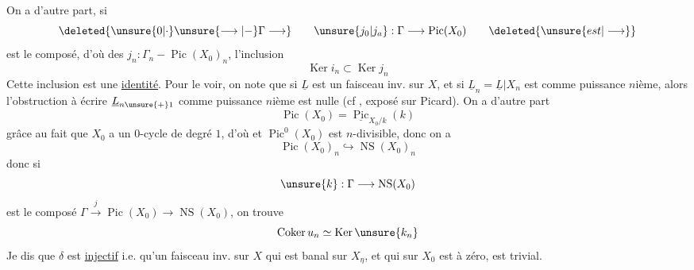 On a d'autre part, si
\[
\deleted{\unsure{0|\cdot}\unsure{\longrightarrow|\mathbin{-}}\Gamma\longrightarrow}\qquad \unsure{j_0|j_a}:\Gamma\longrightarrow\operatorname{Pic}(X_0)\qquad\deleted{\unsure{est|\longrightarrow}}
\]
est le composé, d'où des $j_n:\Gamma_n\mathbin{-}\operatorname{Pic}(X_0)_n$,   l'inclusion \unsure{:|;}
\[
\operatorname{Ker}i_n\subset\operatorname{Ker}j_n
\]
Cette inclusion est  une \uline{identité}. Pour le voir, on note que si $\underline L$ est un faisceau inv. sur $X$, et si $\underline L_n=\underline L|X_n$ est  comme puissance $n$ième, alors l'obstruction à écrire $\underline L_{n\unsure{+}1}$ comme puissance $n$ième est nulle (cf , exposé sur Picard). On a d'autre part
\[
\operatorname{Pic}(X_0)=\underline{\operatorname{Pic}}_{X_0/k}(k)
\]
grâce au fait que $X_0$ a un $0$-cycle de degré $1$, d'où
et $\operatorname{Pic}^{0}(X_0)$ est $n$-divisible, donc on a
\[
\operatorname{Pic}(X_0)_n\hookrightarrow\operatorname{NS}(X_0)_n
\]
donc si
\[
\unsure{k}:\Gamma\longrightarrow\operatorname{NS}(X_0)
\]
est le composé $\Gamma\xrightarrow{j}\operatorname{Pic}(X_0)\longrightarrow\operatorname{NS}(X_0)$, on trouve
\[
\operatorname{Coker}u_n\simeq\operatorname{Ker}\unsure{k_n}
\]
Je dis que  $\delta$ est \uline{injectif} i.e. qu'un faisceau inv. sur $X$ qui est banal sur $X_\eta$, et qui sur $X_0$ est   à zéro, est trivial.
